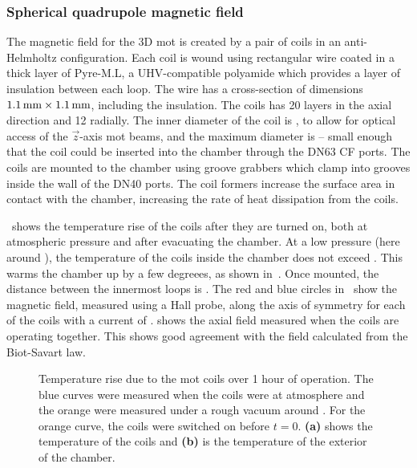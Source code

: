 \subsubsection{Spherical quadrupole magnetic field}
The magnetic field for the 3D \ac{mot} is created by a pair of coils in an
anti-Helmholtz configuration. Each coil is wound using rectangular wire coated in a
 thick layer of Pyre-M.L, a UHV-compatible polyamide
which provides a layer of insulation between each loop. The wire has a
cross-section of dimensions \(\sivalue{1.1}{\milli\metre} \times
\sivalue{1.1}{\milli\metre}\), including the insulation. The coils has
20 layers in the axial direction and 12 radially. The
inner diameter of the coil is , to allow for optical
access of the \(\vec{z}\)-axis \ac{mot} beams, and the maximum diameter is
 -- small enough that the coil could be
inserted into the chamber through the DN63 CF ports. The coils are mounted to
the chamber using groove grabbers which clamp into grooves inside the wall of
the DN40 ports. The coil formers increase the surface area in contact
with the chamber, increasing the rate of heat dissipation from the
coils. 
\par\noindent 
{}~shows the temperature rise of the coils
after they are turned on, both at atmospheric pressure and after evacuating
the chamber. At a low pressure (here around
), the
temperature of the coils inside the chamber does not exceed
. This warms the chamber up by a few degreees,
as shown in~. Once mounted, the distance between the
innermost
loops is . The red and blue circles in~
 show the
magnetic field, measured using a Hall probe, along the axis of symmetry for each
of the coils with a current of .
 shows the axial field measured when the coils
are operating together. This shows good agreement with the field
calculated from the Biot-Savart law.
\begin{figure}[!htbp]
	\centering
	\def\svgwidth{\columnwidth}
	\caption[\ac{mot} coil temperature rise]{Temperature rise due to the
  \ac{mot} coils over 1 hour of operation. The blue curves were
measured when the coils were at atmosphere and the orange were
measured under a rough vacuum around . For
the orange curve, the coils were switched on before $t=0$.
\textbf{(a)} shows the temperature of the coils and \textbf{(b)} is
the temperature of the exterior of the chamber.}
	\label{fig:mot_coil_temp_both}
\end{figure}


